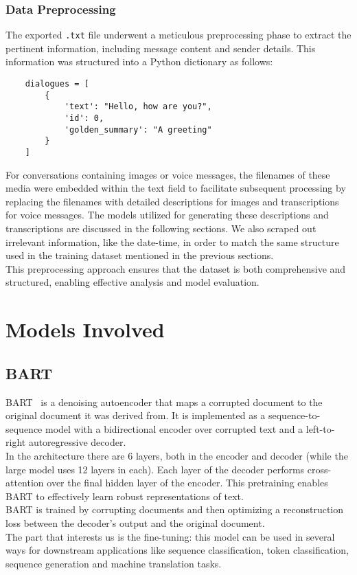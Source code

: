 \documentclass[10pt,twocolumn,letterpaper]{article}
\begin{document}
\subsubsection{Data Preprocessing}

\hspace{1em}The exported \texttt{.txt} file underwent a meticulous preprocessing phase to extract the pertinent information, including message content and sender details. 
This information was structured into a Python dictionary as follows:

\begin{lstlisting}
    dialogues = [
        {
            'text': "Hello, how are you?",
            'id': 0,
            'golden_summary': "A greeting"
        }
    ]
\end{lstlisting}
For conversations containing images or voice messages, the filenames of these media were embedded within the text field to facilitate subsequent processing by replacing the filenames with detailed descriptions for images and transcriptions for voice messages. 
The models utilized for generating these descriptions and transcriptions are discussed in the following sections.
We also scraped out irrelevant information, like the date-time, in order to match the same structure used in the training dataset mentioned in the previous sections. \\
This preprocessing approach ensures that the dataset is both comprehensive and structured, enabling effective analysis and model evaluation.
\section{Models Involved}

\subsection{BART}

BART~\cite{lewis2019bart} is a denoising autoencoder that maps a corrupted document to the original document it was derived from. It is implemented as a sequence-to-sequence model with a bidirectional encoder over 
corrupted text and a left-to-right autoregressive decoder. \\
In the architecture there are 6 layers, both in the encoder and decoder (while the large model uses 12 layers in each). Each layer of the decoder performs cross-attention over the final hidden layer of the 
encoder. This pretraining enables BART to effectively learn robust representations of text.\\
BART is trained by corrupting documents and then optimizing a reconstruction loss between the decoder's output and the original document. \\
The part that interests us is the fine-tuning: this model can be used in several ways for downstream applications like sequence classification, token classification, sequence generation and machine translation tasks. 
\end{document}
